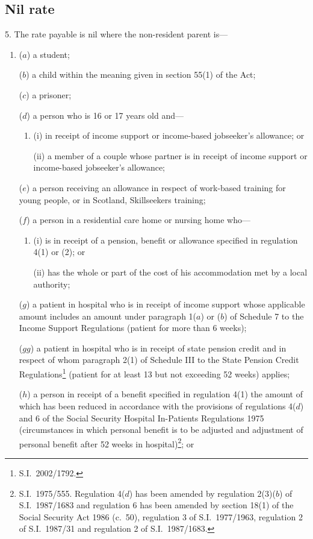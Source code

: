 \documentclass[12pt,a4paper]{article}
\begin{document}
\subsection[5. Nil rate]{Nil rate}

5.  The rate payable is nil where the non-resident parent is—
\begin{enumerate}\item[]
($a$) a student;

($b$) a child within the meaning given in section 55(1) of the Act;

($c$) a prisoner;

($d$) a person who is 16 or 17 years old and—
\begin{enumerate}\item[]
(i) in receipt of income support or income-based jobseeker’s allowance; or

(ii) a member of a couple whose partner is in receipt of income support or income-based jobseeker’s allowance;
\end{enumerate}

($e$) a person receiving an allowance in respect of work-based training for young people, or in Scotland, Skillseekers training;

($f$) a person in a residential care home or nursing home who—
\begin{enumerate}\item[]
(i) is in receipt of a pension, benefit or allowance specified in regulation 4(1) or (2); or

(ii) has the whole or part of the cost of his accommodation met by a local authority;
\end{enumerate}

($g$) a patient in hospital who is in receipt of income support whose applicable amount includes an amount under paragraph 1($a$)  or ($b$)  of Schedule 7 to the Income Support Regulations (patient for more than 6 weeks);

($gg$) a patient in hospital who is in receipt of state pension credit and in respect of whom paragraph 2(1) of Schedule III to the State Pension Credit Regulations\footnote{S.I.\ 2002/1792.} (patient for at least 13 but not exceeding 52 weeks) applies;

($h$) a person in receipt of a benefit specified in regulation 4(1) the amount of which has been reduced in accordance with the provisions of regulations 4($d$)  and 6 of the Social Security Hospital In-Patients Regulations 1975 (circumstances in which personal benefit is to be adjusted and adjustment of personal benefit after 52 weeks in hospital)\footnote{S.I.\ 1975/555. Regulation 4($d$) has been amended by regulation 2(3)($b$) of S.I.\ 1987/1683 and regulation 6 has been amended by section 18(1) of the Social Security Act 1986 (c.\ 50), regulation 3 of S.I.\ 1977/1963, regulation 2 of S.I.\ 1987/31 and regulation 2 of S.I.\ 1987/1683.}; or


\end{enumerate}
\end{document}
